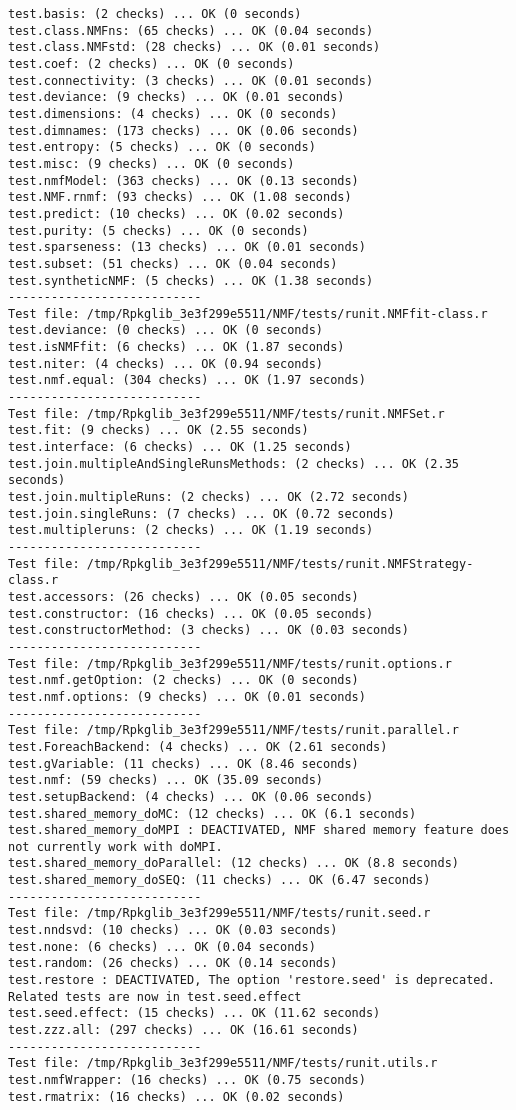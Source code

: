 \documentclass[10pt]{article}\usepackage{graphicx, color}
\begin{document}
\begin{verbatim}
test.basis: (2 checks) ... OK (0 seconds)
test.class.NMFns: (65 checks) ... OK (0.04 seconds)
test.class.NMFstd: (28 checks) ... OK (0.01 seconds)
test.coef: (2 checks) ... OK (0 seconds)
test.connectivity: (3 checks) ... OK (0.01 seconds)
test.deviance: (9 checks) ... OK (0.01 seconds)
test.dimensions: (4 checks) ... OK (0 seconds)
test.dimnames: (173 checks) ... OK (0.06 seconds)
test.entropy: (5 checks) ... OK (0 seconds)
test.misc: (9 checks) ... OK (0 seconds)
test.nmfModel: (363 checks) ... OK (0.13 seconds)
test.NMF.rnmf: (93 checks) ... OK (1.08 seconds)
test.predict: (10 checks) ... OK (0.02 seconds)
test.purity: (5 checks) ... OK (0 seconds)
test.sparseness: (13 checks) ... OK (0.01 seconds)
test.subset: (51 checks) ... OK (0.04 seconds)
test.syntheticNMF: (5 checks) ... OK (1.38 seconds)
--------------------------- 
Test file: /tmp/Rpkglib_3e3f299e5511/NMF/tests/runit.NMFfit-class.r 
test.deviance: (0 checks) ... OK (0 seconds)
test.isNMFfit: (6 checks) ... OK (1.87 seconds)
test.niter: (4 checks) ... OK (0.94 seconds)
test.nmf.equal: (304 checks) ... OK (1.97 seconds)
--------------------------- 
Test file: /tmp/Rpkglib_3e3f299e5511/NMF/tests/runit.NMFSet.r 
test.fit: (9 checks) ... OK (2.55 seconds)
test.interface: (6 checks) ... OK (1.25 seconds)
test.join.multipleAndSingleRunsMethods: (2 checks) ... OK (2.35 seconds)
test.join.multipleRuns: (2 checks) ... OK (2.72 seconds)
test.join.singleRuns: (7 checks) ... OK (0.72 seconds)
test.multipleruns: (2 checks) ... OK (1.19 seconds)
--------------------------- 
Test file: /tmp/Rpkglib_3e3f299e5511/NMF/tests/runit.NMFStrategy-class.r 
test.accessors: (26 checks) ... OK (0.05 seconds)
test.constructor: (16 checks) ... OK (0.05 seconds)
test.constructorMethod: (3 checks) ... OK (0.03 seconds)
--------------------------- 
Test file: /tmp/Rpkglib_3e3f299e5511/NMF/tests/runit.options.r 
test.nmf.getOption: (2 checks) ... OK (0 seconds)
test.nmf.options: (9 checks) ... OK (0.01 seconds)
--------------------------- 
Test file: /tmp/Rpkglib_3e3f299e5511/NMF/tests/runit.parallel.r 
test.ForeachBackend: (4 checks) ... OK (2.61 seconds)
test.gVariable: (11 checks) ... OK (8.46 seconds)
test.nmf: (59 checks) ... OK (35.09 seconds)
test.setupBackend: (4 checks) ... OK (0.06 seconds)
test.shared_memory_doMC: (12 checks) ... OK (6.1 seconds)
test.shared_memory_doMPI : DEACTIVATED, NMF shared memory feature does not currently work with doMPI.
test.shared_memory_doParallel: (12 checks) ... OK (8.8 seconds)
test.shared_memory_doSEQ: (11 checks) ... OK (6.47 seconds)
--------------------------- 
Test file: /tmp/Rpkglib_3e3f299e5511/NMF/tests/runit.seed.r 
test.nndsvd: (10 checks) ... OK (0.03 seconds)
test.none: (6 checks) ... OK (0.04 seconds)
test.random: (26 checks) ... OK (0.14 seconds)
test.restore : DEACTIVATED, The option 'restore.seed' is deprecated. Related tests are now in test.seed.effect
test.seed.effect: (15 checks) ... OK (11.62 seconds)
test.zzz.all: (297 checks) ... OK (16.61 seconds)
--------------------------- 
Test file: /tmp/Rpkglib_3e3f299e5511/NMF/tests/runit.utils.r 
test.nmfWrapper: (16 checks) ... OK (0.75 seconds)
test.rmatrix: (16 checks) ... OK (0.02 seconds)


\end{verbatim}
\end{document}
